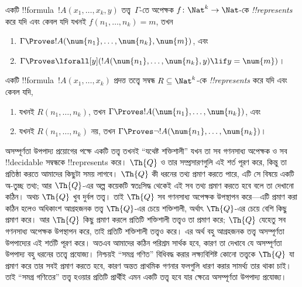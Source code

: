 \documentclass[../../../include/open-logic-section]{subfiles}
\begin{document}
\begin{defn}
একটি !!{formula}~$!A(x_1, \dots, x_k, y)$ তত্ত্ব~$\Gamma$-তে অপেক্ষক
$f\colon \Nat^k \to \Nat$-কে \emph{!!{represents}} করে যদি এবং কেবল যদি
যখনই $f(n_1, \dots, n_k) = m$, তখন
\begin{enumerate}
\item $\Gamma \Proves !A(\num{n_1}, \dots, \num{n_k}, \num{m})$, এবং
\item $\Gamma \Proves \lforall[y](!A(\num{n_1}, \dots, \num{n_k},
y) \lif y = \num{m})$।
\end{enumerate}
\end{defn}

\begin{defn}
একটি !!{formula}~$!A(x_1, \dots, x_k)$ প্রদত্ত তত্ত্বে সম্বন্ধ
$R \subseteq \Nat^k$-কে \emph{!!{represents}} করে যদি এবং কেবল যদি,
\begin{enumerate}
\item যখনই $R(n_1, \dots, n_k)$, তখন $\Gamma \Proves !A(\num{n_1},
\dots, \num{n_k})$, এবং
\item যখনই $R(n_1, \dots, n_k)$ নয়, তখন $\Gamma \Proves \lnot
!A(\num{n_1}, \dots, \num{n_k})$।
\end{enumerate}
\end{defn}

অসম্পূর্ণতা উপপাদ্য প্রয়োগের পক্ষে একটি তত্ত্ব তখনই ``যথেষ্ট শক্তিশালী'' যখন
তা সব গণনসাধ্য অপেক্ষক ও সব !!{decidable} সম্বন্ধকে !!{represents} করে।
$\Th{Q}$ ও তার সম্প্রসারণগুলি এই শর্ত পূরণ করে, কিন্তু তা প্রতিষ্ঠা করতে আমাদের
কিছুটা সময় লাগবে। $\Th{Q}$ কী ধরনের তথ্য প্রমাণ করতে পারে, এটি সে বিষয়ে একটি
অ-তুচ্ছ তথ্য; আর $\Th{Q}$-এর অল্প কয়েকটি স্বতঃসিদ্ধ থেকেই এই সব তথ্য প্রমাণ
করতে হবে বলে তা দেখানো কঠিন। অথচ $\Th{Q}$ খুব দুর্বল তত্ত্ব। তাই $\Th{Q}$ সব
গণনসাধ্য অপেক্ষক উপস্থাপন করে—এটি প্রমাণ করা কঠিন হলেও অধিকাংশ আগ্রহজনক তত্ত্ব
$\Th{Q}$-এর চেয়ে শক্তিশালী, অর্থাৎ $\Th{Q}$-এর চেয়ে বেশি কিছু প্রমাণ করে।
আর $\Th{Q}$ কিছু প্রমাণ করলে প্রতিটি শক্তিশালী তত্ত্বও তা প্রমাণ করে; $\Th{Q}$
যেহেতু সব গণনসাধ্য অপেক্ষক উপস্থাপন করে, তাই প্রতিটি শক্তিশালী তত্ত্বও করে।
এর অর্থ বহু আগ্রহজনক তত্ত্ব অসম্পূর্ণতা উপপাদ্যের এই শর্তটি পূরণ করে। অতএব
আমাদের কঠিন পরিশ্রম সার্থক হবে, কারণ তা দেখাবে যে অসম্পূর্ণতা উপপাদ্য বহু ধরনের
তত্ত্বে প্রযোজ্য। নিশ্চয়ই ``সমগ্র গণিত'' বিধিবদ্ধ করার লক্ষ্যবিশিষ্ট কোনো
তত্ত্বকে $\Th{Q}$ যা প্রমাণ করে তার সবই প্রমাণ করতে হবে, কারণ অন্তত প্রাথমিক
গণনার ফলগুলি ধারণ করার সামর্থ্য তার থাকা চাই। তাই ``সমগ্র গণিতের'' তত্ত্ব হওয়ার
প্রতিটি প্রার্থীই এমন একটি তত্ত্ব হবে যার ক্ষেত্রে অসম্পূর্ণতা উপপাদ্য প্রযোজ্য।
\end{document}
